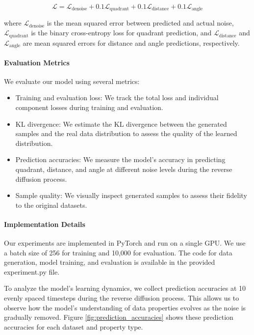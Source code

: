 \documentclass{article} %
\begin{document}
\begin{equation}
    \mathcal{L} = \mathcal{L}_{\text{denoise}} + 0.1 \mathcal{L}_{\text{quadrant}} + 0.1 \mathcal{L}_{\text{distance}} + 0.1 \mathcal{L}_{\text{angle}}
\end{equation}

where $\mathcal{L}_{\text{denoise}}$ is the mean squared error between predicted and actual noise, $\mathcal{L}_{\text{quadrant}}$ is the binary cross-entropy loss for quadrant prediction, and $\mathcal{L}_{\text{distance}}$ and $\mathcal{L}_{\text{angle}}$ are mean squared errors for distance and angle predictions, respectively.

\paragraph{Evaluation Metrics} We evaluate our model using several metrics:
\begin{itemize}
    \item Training and evaluation loss: We track the total loss and individual component losses during training and evaluation.
    \item KL divergence: We estimate the KL divergence between the generated samples and the real data distribution to assess the quality of the learned distribution.
    \item Prediction accuracies: We measure the model's accuracy in predicting quadrant, distance, and angle at different noise levels during the reverse diffusion process.
    \item Sample quality: We visually inspect generated samples to assess their fidelity to the original datasets.
\end{itemize}

\paragraph{Implementation Details} Our experiments are implemented in PyTorch and run on a single GPU. We use a batch size of 256 for training and 10,000 for evaluation. The code for data generation, model training, and evaluation is available in the provided experiment.py file.

To analyze the model's learning dynamics, we collect prediction accuracies at 10 evenly spaced timesteps during the reverse diffusion process. This allows us to observe how the model's understanding of data properties evolves as the noise is gradually removed. Figure \ref{fig:prediction_accuracies} shows these prediction accuracies for each dataset and property type.
\end{document}
